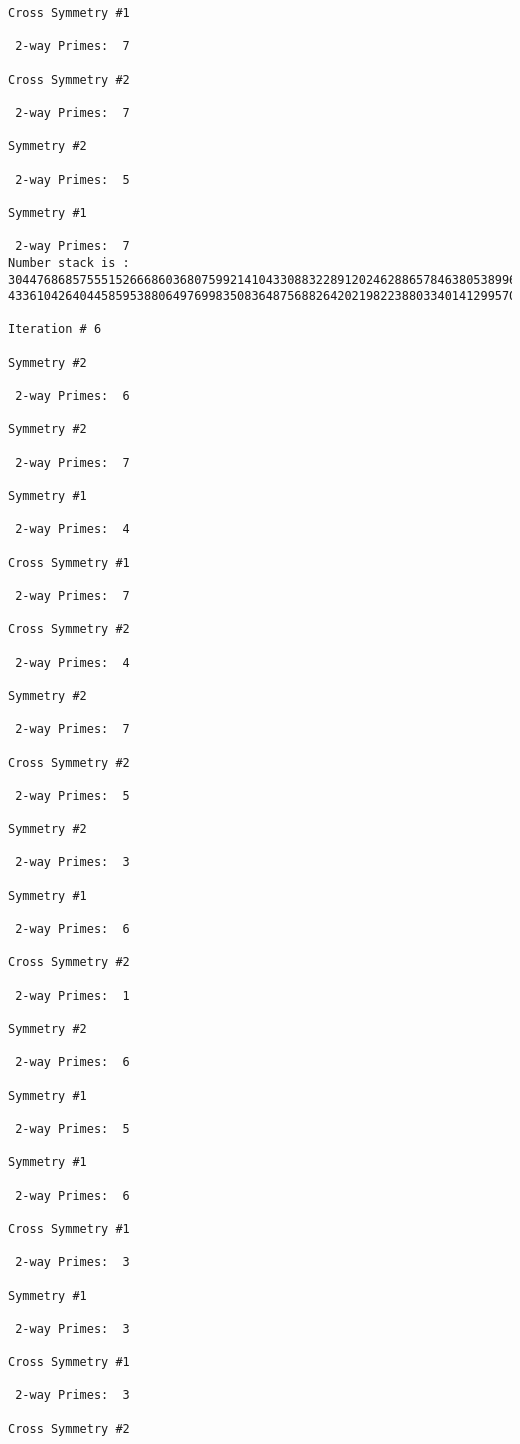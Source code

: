 \begin{verbatim}
Cross Symmetry #1

 2-way Primes: 	7

Cross Symmetry #2

 2-way Primes: 	7

Symmetry #2

 2-way Primes: 	5

Symmetry #1

 2-way Primes: 	7
Number stack is :
30447686857555152666860368075992141043308832289120246288657846380538996794608835958544046240163340857
43361042640445859538806497699835083648756882642021982238803340141299570863068666251555758686744037580

Iteration #	6

Symmetry #2

 2-way Primes: 	6

Symmetry #2

 2-way Primes: 	7

Symmetry #1

 2-way Primes: 	4

Cross Symmetry #1

 2-way Primes: 	7

Cross Symmetry #2

 2-way Primes: 	4

Symmetry #2

 2-way Primes: 	7

Cross Symmetry #2

 2-way Primes: 	5

Symmetry #2

 2-way Primes: 	3

Symmetry #1

 2-way Primes: 	6

Cross Symmetry #2

 2-way Primes: 	1

Symmetry #2

 2-way Primes: 	6

Symmetry #1

 2-way Primes: 	5

Symmetry #1

 2-way Primes: 	6

Cross Symmetry #1

 2-way Primes: 	3

Symmetry #1

 2-way Primes: 	3

Cross Symmetry #1

 2-way Primes: 	3

Cross Symmetry #2


\end{verbatim}
